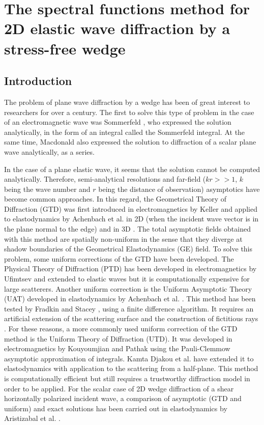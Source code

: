 \chapter[][2D Elastic Case]{The spectral functions method for 2D elastic wave diffraction by a stress-free wedge}
\label{chap-2D}

\section*{Introduction}
The problem of plane wave diffraction by a wedge has been of great interest to researchers for over a century. The first to solve this type of problem in the case of an electromagnetic wave was Sommerfeld \cite{Sommerfeld}, who expressed the solution analytically, in the form of an integral called the Sommerfeld integral. At the same time, Macdonald \cite{Macdo} also expressed the solution to diffraction of a scalar plane wave analytically, as a series.

In the case of a plane elastic wave, it seems that the solution cannot be computed analytically. Therefore, semi-analytical resolutions and far-field ($kr>>1$, $k$ being the wave number and $r$ being the distance of observation) asymptotics have become common approaches. In this regard, the Geometrical Theory of Diffraction (GTD) was first introduced in electromagnetics by Keller \cite{GTD} and applied to elastodynamics by Achenbach et al. in 2D (when the incident wave vector is in the plane normal to the edge)  and in 3D \cite{Achenbach, GTDAchenbach}. The total asymptotic fields obtained with this method are spatially non-uniform in the sense that they diverge at shadow boundaries of the Geometrical Elastodynamics (GE) field. To solve this problem, some uniform corrections of the GTD have been developed. The Physical Theory of Diffraction (PTD) has been developed in electromagnetics by Ufimtsev \cite{Ufmi} and extended to elastic waves \cite{Zernov,PTDdarmon} but it is computationally expensive for large scatterers. Another uniform correction is the Uniform Asymptotic Theory (UAT) developed in elastodynamics by Achenbach et al. \cite{Achenbach}. This method has been tested by Fradkin and Stacey \cite{Fradkinelliptic}, using a finite difference algorithm. It requires an artificial extension of the scattering surface and the construction of fictitious rays \cite{Bouche}. For these reasons, a more commonly used uniform correction of the GTD method is the Uniform Theory of Diffraction (UTD). It was developed in electromagnetics by Kouyoumjian and Pathak \cite{Kouyoumjian} using the Pauli-Clemmow \cite{Pauli} asymptotic approximation of integrals. Kamta Djakou et al. \cite{Audrey} have extended it to elastodynamics with application to the scattering from a half-plane. This method is computationally efficient but still requires a trustworthy diffraction model in order to be applied. For the scalar case of 2D wedge diffraction of a shear horizontally polarized incident wave, a comparison of asymptotic (GTD and uniform) and exact solutions has been carried out in elastodynamics by Aristizabal et al. \cite{Aristizabal}.

